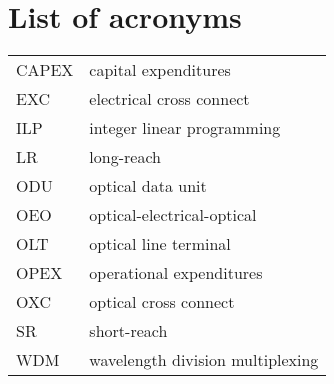 \chapter*{List of acronyms}

\begin{table}[!ht]
\renewcommand{\arraystretch}{1.3}
	\flushright	
	\begin{tabular}{l l}
CAPEX & capital expenditures \\[3mm]	
EXC & electrical cross connect \\[3mm]		
ILP & integer linear programming \\[3mm]	
LR & long-reach \\ [3mm]	
ODU & optical data unit \\		
OEO & optical-electrical-optical \\
OLT & optical line terminal \\	
OPEX & operational expenditures \\
OXC & optical cross connect \\[3mm]
SR & short-reach	\\[3mm]	
WDM & wavelength division multiplexing \qquad\qquad\qquad\qquad\qquad\qquad\qquad\qquad\qquad\\
	\end{tabular}	
\end{table}
